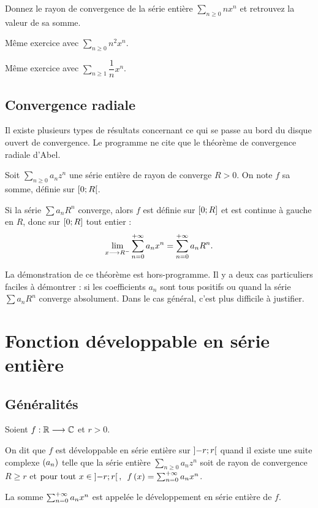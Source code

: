 \begin{exo}
Donnez le rayon de convergence de la série entière \(\sum_{n\geq0}nx^n\) et retrouvez la valeur de sa somme.
\end{exo}

\begin{exo}
Même exercice avec \(\sum_{n\geq0}n^2x^n\).
\end{exo}

\begin{exo}
Même exercice avec \(\sum_{n\geq1}\dfrac{1}{n}x^n\).
\end{exo}

\subsection{Convergence radiale}

Il existe plusieurs types de résultats concernant ce qui se passe au bord du disque ouvert de convergence. Le programme ne cite que le théorème de convergence radiale d'Abel.

\begin{theo}
Soit \(\sum_{n\geq0}a_nz^n\) une série entière de rayon de converge \(R>0\). On note \(f\) sa somme, définie sur \(\left[0;R\right[\).

Si la série \(\sum a_nR^n\) converge, alors \(f\) est définie sur \(\left[0;R\right]\) et est continue à gauche en \(R\), donc sur \(\left[0;R\right]\) tout entier : \[\lim_{x\longrightarrow R^-}\sum_{n=0}^{+\infty}a_nx^n=\sum_{n=0}^{+\infty}a_nR^n.\]
\end{theo}

La démonstration de ce théorème est hors-programme. Il y a deux cas particuliers faciles à démontrer : si les coefficients \(a_n\) sont tous positifs ou quand la série \(\sum a_nR^n\) converge absolument. Dans le cas général, c'est plus difficile à justifier.

\section{Fonction développable en série entière}

\subsection{Généralités}

\begin{defi}
Soient \(f:\mathbb{R}\longrightarrow\mathbb{C}\) et \(r>0\).

On dit que \(f\) est développable en série entière sur \(\left]-r;r\right[\) quand il existe une suite complexe \(\left(a_n\right)\) telle que la série entière \(\sum_{n\geq0}a_nz^n\) soit de rayon de convergence \(R\geq r\) et \(\quantifs{\tpt x\in\intervee{-r}{r}}f\paren{x}=\sum_{n=0}^{\pinf}a_nx^n\).

La somme \(\sum_{n=0}^{+\infty}a_nx^n\) est appelée le développement en série entière de \(f\).
\end{defi}


